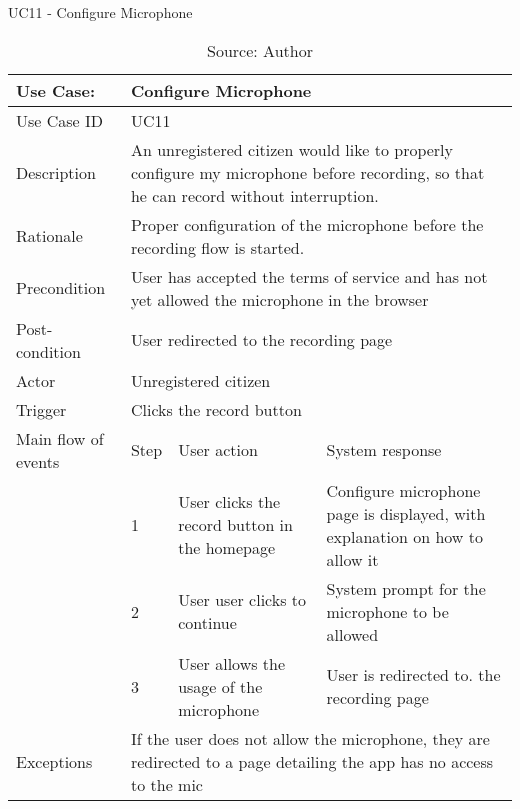 \begin{table}[ht]
\centering
\caption{UC11 - Configure Microphone}
\label{uc:11}
\begin{tabular}{|p{3cm}|p{1cm}|p{5cm}|p{5cm}|}
\hline
Use Case:       & \multicolumn{3}{p{11cm}|}{Configure Microphone} \\ \hline
Use Case ID     & \multicolumn{3}{p{11cm}|}{UC11} \\ \hline
Description     & \multicolumn{3}{p{11cm}|}{An unregistered citizen would like to properly configure my microphone before recording, so that he can record without interruption.} \\ \hline
Rationale       & \multicolumn{3}{p{11cm}|}{Proper configuration of the microphone before the recording flow is started.} \\ \hline
Precondition    & \multicolumn{3}{p{11cm}|}{User has accepted the terms of service and has not yet allowed the microphone in the browser} \\ \hline
Post-condition  & \multicolumn{3}{p{11cm}|}{User redirected to the recording page} \\ \hline
Actor           & \multicolumn{3}{p{11cm}|}{Unregistered citizen} \\ \hline
Trigger         & \multicolumn{3}{p{11cm}|}{Clicks the record button} \\ \hline
Main flow of events & Step  & User action & System response \\ \hline
                    & 1     & User clicks the record button in the homepage & Configure microphone page is displayed, with explanation on how to allow it \\ \hline
                    & 2     & User user clicks to continue & System prompt for the microphone to be allowed \\ \hline
                    & 3     & User allows the usage of the microphone & User is redirected to. the recording page \\ \hline
Exceptions      & \multicolumn{3}{p{11cm}|}{If the user does not allow the microphone, they are redirected to a page detailing the app has no access to the mic} \\ \hline
\end{tabular}
\caption*{Source: Author}
\end{table}

